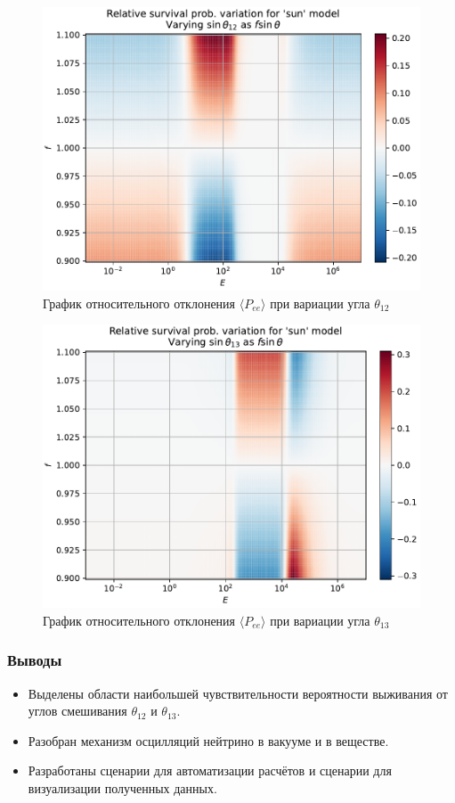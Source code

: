 \documentclass[utf8,9pt,mathserif,usepdftitle=false]{beamer}
\begin{document}
\begin{frame}
	\begin{figure}[h]
		\centering
		\includegraphics[width=0.8\linewidth]{sun-in-ang12}
		\caption{График относительного отклонения \(\langle P_{ee}\rangle\) при
      вариации угла \(\theta_{12}\) }
	\end{figure}
\end{frame}

\begin{frame}
	\begin{figure}[h]
		\centering
		\includegraphics[width=0.8\linewidth]{sun-in-ang13}
		\caption{График относительного отклонения \(\langle P_{ee}\rangle\) при
      вариации угла \(\theta_{13}\)}
	\end{figure}
\end{frame}

\begin{frame}
	\frametitle{Выводы}
	\begin{itemize}
  \item<1-> Выделены области наибольшей чувствительности вероятности выживания от 
  углов смешивания \(\theta_{12}\) и \(\theta_{13}\).
  \item<2-> Разобран механизм осцилляций нейтрино в вакууме и в веществе.
   \item<3-> Разработаны сценарии для автоматизации расчётов и сценарии для
   визуализации полученных данных.
	\end{itemize}
\end{frame}
\end{document}
